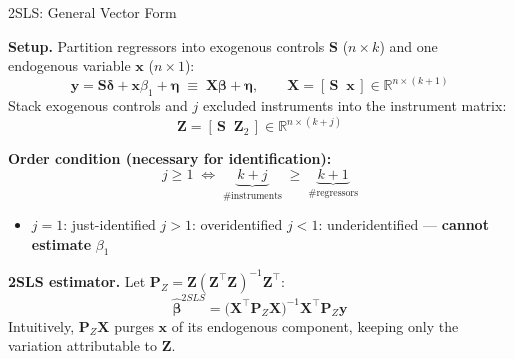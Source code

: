 \documentclass[9pt]{beamer}
\begin{document}
\begin{frame}{2SLS: General Vector Form}

  \textbf{Setup.} Partition regressors into exogenous controls $\mathbf{S}$ ($n\times k$) and one endogenous variable $\mathbf{x}$ ($n\times 1$):
  \[
    \mathbf{y} = \mathbf{S}\bm{\delta} + \mathbf{x}\beta_1 + \bm{\eta}
    \;\equiv\; \mathbf{X}\bm{\beta} + \bm{\eta},
    \qquad \mathbf{X} = [\,\mathbf{S}\;\;\mathbf{x}\,] \in \mathbb{R}^{n\times(k+1)}
  \]
  Stack exogenous controls and $j$ excluded instruments into the instrument matrix:
  \[
    \mathbf{Z} = [\,\mathbf{S}\;\;\mathbf{Z}_{\!2}\,] \in \mathbb{R}^{n\times(k+j)}
  \]

  \medskip
  \textbf{Order condition (necessary for identification):}
  \[
    j \geq 1
    \;\Longleftrightarrow\;
    \underbrace{k+j}_{\text{\# instruments}} \;\geq\; \underbrace{k+1}_{\text{\# regressors}}
  \]
  \begin{itemize}
    \item $j=1$: \textcolor{slideblue}{just-identified} \quad $j>1$: overidentified \quad \alert{$j<1$: underidentified --- \textbf{cannot estimate} $\beta_1$}
  \end{itemize}

  \medskip
  \textbf{2SLS estimator.} Let $\mathbf{P}_Z = \mathbf{Z}(\mathbf{Z}^\top\mathbf{Z})^{-1}\mathbf{Z}^\top$:
  \[
    \boxed{
      \hat{\bm{\beta}}^{2SLS}
      = \bigl(\mathbf{X}^\top \mathbf{P}_Z \mathbf{X}\bigr)^{-1}
        \mathbf{X}^\top \mathbf{P}_Z \mathbf{y}
    }
  \]
  Intuitively, $\mathbf{P}_Z\mathbf{X}$ purges $\mathbf{x}$ of its endogenous component, keeping only the variation attributable to $\mathbf{Z}$.

\end{frame}
\end{document}
